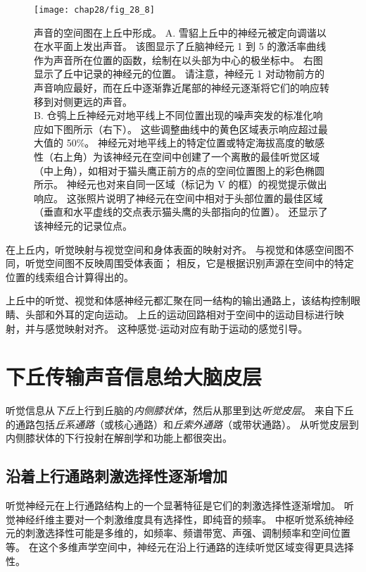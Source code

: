 \begin{figure}[htbp]
	\centering
	\texttt{[image: chap28/fig\_28\_8]}
	\caption{声音的空间图在上丘中形成。 
		A. 雪貂上丘中的神经元被定向调谐以在水平面上发出声音。
		该图显示了丘脑神经元 1 到 5 的激活率曲线作为声音所在位置的函数，绘制在以头部为中心的极坐标中。
		右图显示了丘中记录的神经元的位置。 
		请注意，神经元 1 对动物前方的声音响应最好，而在丘中逐渐靠近尾部的神经元逐渐将它们的响应转移到对侧更远的声音\cite{king1999sensory}。\\
		B. 仓鸮上丘神经元对地平线上不同位置出现的噪声突发的标准化响应如下图所示（右下）。
		这些调整曲线中的黄色区域表示响应超过最大值的 50\%。
		神经元对地平线上的特定位置或特定海拔高度的敏感性（右上角）为该神经元在空间中创建了一个离散的最佳听觉区域（中上角），如相对于猫头鹰正前方的点的空间位置图上的彩色椭圆所示。
		神经元也对来自同一区域（标记为 V 的框）的视觉提示做出响应。
		这张照片说明了神经元在空间中相对于头部位置的最佳区域（垂直和水平虚线的交点表示猫头鹰的头部指向的位置）。
		还显示了该神经元的记录位点\cite{cohen1999maps}。}
	\label{fig:28_8}
\end{figure}


在上丘内，听觉映射与视觉空间和身体表面的映射对齐。
与视觉和体感空间图不同，听觉空间图不反映周围受体表面；
相反，它是根据识别声源在空间中的特定位置的线索组合计算得出的。


上丘中的听觉、视觉和体感神经元都汇聚在同一结构的输出通路上，该结构控制眼睛、头部和外耳的定向运动。
上丘的运动回路相对于空间中的运动目标进行映射，并与感觉映射对齐。
这种感觉-运动对应有助于运动的感觉引导。



\section{下丘传输声音信息给大脑皮层}

听觉信息从\textit{下丘}上行到丘脑的\textit{内侧膝状体}，然后从那里到达\textit{听觉皮层}。
来自下丘的通路包括\textit{丘系通路}（或核心通路）和\textit{丘索外通路}（或带状通路）。
从听觉皮层到内侧膝状体的下行投射在解剖学和功能上都很突出。



\subsection{沿着上行通路刺激选择性逐渐增加}

听觉神经元在上行通路结构上的一个显著特征是它们的刺激选择性逐渐增加。
听觉神经纤维主要对一个刺激维度具有选择性，即纯音的频率。
中枢听觉系统神经元的刺激选择性可能是多维的，如频率、频谱带宽、声强、调制频率和空间位置等。
在这个多维声学空间中，神经元在沿上行通路的连续听觉区域变得更具选择性。


